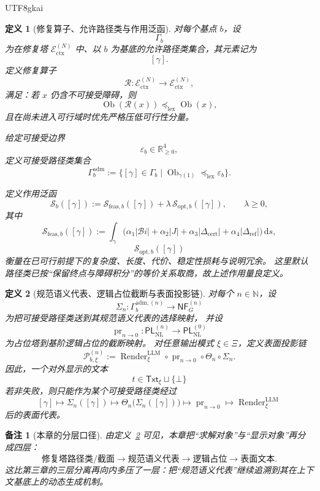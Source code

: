 \documentclass[12pt]{article}
\newtheorem{definition}{定义}[section]
\newtheorem{remark}{备注}[section]
\newcommand{\Render}{\operatorname{Render}}
\begin{document}
\begin{CJK*}{UTF8}{gkai}
\begin{definition}[修复算子、允许路径类与作用泛函]
\label{def:tex37-ch4-action}
对每个基点 $b$，设
\[
  \Gamma_b
\]
为在修复塔 $\mathcal{E}^{(N)}_{\mathrm{ctx}}$ 中、以 $b$ 为基底的允许路径类集合，其元素记为
\[
  [\gamma].
\]
定义修复算子
\[
  \mathcal{R}:\mathcal{E}^{(N)}_{\mathrm{ctx}}\to \mathcal{E}^{(N)}_{\mathrm{ctx}},
\]
满足：若 $x$ 仍含不可接受障碍，则
\[
  \operatorname{Ob}(\mathcal{R}(x))
  \preceq_{\mathrm{lex}}
  \operatorname{Ob}(x),
\]
且在尚未进入可行域时优先严格压低可行性分量。

给定可接受边界
\[
  \varepsilon_b\in \mathbb{R}_{\ge 0}^{4},
\]
定义可接受路径类集合
\[
  \Gamma_b^{\mathrm{adm}}
  :=
  \bigl\{
    [\gamma]\in \Gamma_b
    \mid
    \operatorname{Ob}_{\gamma(1)}
    \preceq_{\mathrm{lex}}
    \varepsilon_b
  \bigr\}.
\]

定义作用泛函
\[
  \mathcal{S}_b([\gamma])
  :=
  \mathcal{S}_{\mathrm{feas},b}([\gamma])
  +
  \lambda\,\mathcal{S}_{\mathrm{opt},b}([\gamma]),
  \qquad
  \lambda\ge 0,
\]
其中
\[
  \mathcal{S}_{\mathrm{feas},b}([\gamma])
  :=
  \int_{\gamma}
  \bigl(
    \alpha_1|\mathcal{B}\!i|
    +
    \alpha_2|J|
    +
    \alpha_3|\Delta_{\mathrm{cert}}|
    +
    \alpha_4|\Delta_{\mathrm{ref}}|
  \bigr)\,\mathrm{d}s,
\]
\[
  \mathcal{S}_{\mathrm{opt},b}([\gamma])
\]
衡量在已可行前提下的复杂度、长度、代价、稳定性损耗与说明冗余。
这里默认路径类已按“保留终点与障碍积分”的等价关系取商，故上述作用量良定义。
\end{definition}

\begin{definition}[规范语义代表、逻辑占位截断与表面投影链]
\label{def:tex37-ch4-projection}
对每个 $n\in\mathbb{N}$，设
\[
  \Sigma_n:\Gamma_b^{\mathrm{adm},(n)}\to \mathsf{NF}_G^{(n)}
\]
为把可接受路径类送到其规范语义代表的选择映射，
并设
\[
  \operatorname{pr}_{n\to 0}:\mathsf{PL}_{\mathrm{NL}}^{(n)}\to \mathsf{PL}_{\mathrm{NL}}^{(0)}
\]
为占位塔到基阶逻辑占位的截断映射。
对任意输出模式 $\xi\in\Xi$，定义表面投影链
\[
  \mathcal{P}^{(n)}_{b,\xi}
  :=
  \Render^{\mathrm{LLM}}_\xi
  \circ
  \operatorname{pr}_{n\to 0}
  \circ
  \Theta_n
  \circ
  \Sigma_n.
\]
因此，一个对外显示的文本
\[
  t\in \mathsf{Txt}_\xi\sqcup\{\bot\}
\]
若非失败，则只能作为某个可接受路径类经过
\[
  [\gamma]
  \longmapsto
  \Sigma_n([\gamma])
  \longmapsto
  \Theta_n\bigl(\Sigma_n([\gamma])\bigr)
  \longmapsto
  \operatorname{pr}_{n\to 0}
  \longmapsto
  \Render^{\mathrm{LLM}}_\xi
\]
后的表面代表。
\end{definition}

\begin{remark}[本章的分层口径]
由定义~\ref{def:tex37-ch4-projection} 可见，本章把“求解对象”与“显示对象”再分成四层：
\[
  \text{修复塔路径类/截面}
  \to
  \text{规范语义代表}
  \to
  \text{逻辑占位}
  \to
  \text{表面文本}.
\]
这比第三章的三层分离再向内多压了一层：把“规范语义代表”继续追溯到其在上下文基底上的动态生成机制。
\end{remark}


\end{CJK*}
\end{document}
